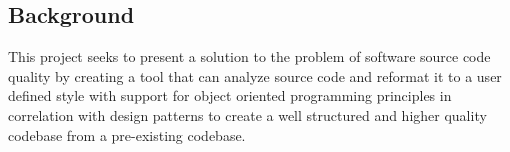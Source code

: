 \subsection{Background}
This project seeks to present a solution to the problem of software source code quality by creating a tool that can analyze source code and reformat it to a user defined style with support for object oriented programming principles in correlation with design patterns to create a well structured and higher quality codebase from a pre-existing codebase.
